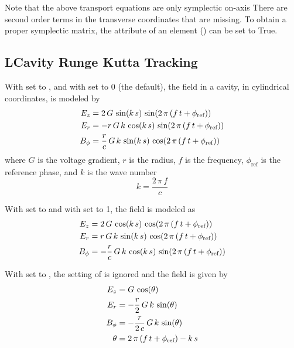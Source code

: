 Note that the above transport equations are only symplectic on-axis There are second order terms in
the transverse coordinates that are missing. To obtain a proper symplectic matrix, the
 attribute of an  element () can be set to True.

\subsection{LCavity Runge Kutta Tracking}

With  set to , and with  set to 0 (the
default), the field in a cavity, in cylindrical coordinates, is modeled by
\begin{align}
  E_z    &=           2 \, G \,      \sin(k \, s) \, \sin(2 \, \pi \, (f \, t + \phi_\text{ref})) \nonumber \\
  E_r    &=          -r \, G \, k \, \cos(k \, s) \, \sin(2 \, \pi \, (f \, t + \phi_\text{ref})) \\
  B_\phi &= \frac{r}{c} \, G \, k \, \sin(k \, s) \, \cos(2 \, \pi \, (f \, t + \phi_\text{ref})) \nonumber
\end{align}
where $G$ is the voltage gradient, $r$ is the radius, $f$ is the frequency, $\phi_\text{ref}$ is the
reference phase, and $k$ is the wave number
\begin{equation}
  k = \frac{2 \, \pi \, f}{c}
\end{equation}

With  set to  and with  set to 1, the field is modeled as
\begin{align}
  E_z    &=            2 \, G \,      \cos(k \, s) \, \cos(2 \, \pi \, (f \, t + \phi_\text{ref})) \nonumber \\
  E_r    &=            r \, G \, k \, \sin(k \, s) \, \cos(2 \, \pi \, (f \, t + \phi_\text{ref})) \\
  B_\phi &= -\frac{r}{c} \, G \, k \, \cos(k \, s) \, \sin(2 \, \pi \, (f \, t + \phi_\text{ref})) \nonumber
\end{align}

With  set to , the setting of  is ignored
and the field is given by
\begin{align}
  E_z    &=                      G \,      \cos(\theta) \nonumber \\
  E_r    &= -\frac{r}{2}      \, G \, k \, \sin(\theta) \\
  B_\phi &= -\frac{r}{2 \, c} \, G \, k \, \sin(\theta) \nonumber \\
  \theta &= 2 \, \pi \, (f \, t + \phi_\text{ref}) - k \, s \nonumber
\end{align}

